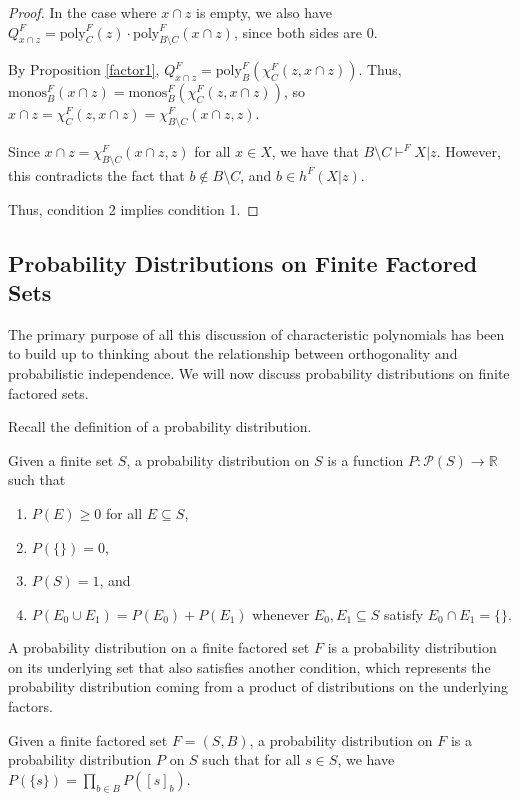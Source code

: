\documentclass[authordate,onecolumn]{miri-tech-article}
\begin{document}
\begin{proof}
In the case where $x\cap z$ is empty, we also have $Q^F_{x\cap z}= \text{poly}^F_{C}(z)\cdot \text{poly}^F_{B\setminus C}(x\cap z)$, since both sides are 0.

By Proposition \ref{factor1}, $Q^F_{x\cap z}=\text{poly}^F_{B}(\chi^F_{C}(z,x\cap z))$. Thus, $\text{monos}^F_B(x\cap z)=\text{monos}^F_B(\chi^F_{C}(z,x\cap z))$, so $x\cap z=\chi^F_{C}(z,x\cap z)=\chi^F_{B\setminus C}(x\cap z,z)$.

Since $x\cap z=\chi^F_{B\setminus C}(x\cap z,z)$ for all $x\in X$, we have that $B\setminus C\vdash^F X|z$. However, this contradicts the fact that $b\notin B\setminus C$, and $b\in h^F(X|z)$.

Thus, condition 2 implies condition 1.
\end{proof}
\subsection{Probability Distributions on Finite Factored Sets}
The primary purpose of all this discussion of characteristic polynomials has been to build up to thinking about the relationship between orthogonality and probabilistic independence. We will now discuss probability distributions on finite factored sets.

Recall the definition of a probability distribution.
\begin{definition}
Given a finite set $S$, a probability distribution on $S$ is a function $P:\mathcal{P}(S)\rightarrow\mathbb{R}$ such that \begin{enumerate}
    \item $P(E)\geq 0$ for all $E\subseteq S$,
    \item $P(\{\})=0$,
    \item $P(S)=1$, and
    \item $P(E_0\cup E_1)=P(E_0)+P(E_1)$ whenever $E_0,E_1\subseteq S$ satisfy $E_0\cap E_1=\{\}$.
\end{enumerate}
\end{definition}
A probability distribution on a finite factored set $F$ is a probability distribution on its underlying set that also satisfies another condition, which represents the probability distribution coming from a product of distributions on the underlying factors.
\begin{definition}
Given a finite factored set $F=(S,B)$, a probability distribution on $F$ is a probability distribution $P$ on $S$ such that for all $s\in S$, we have $P(\{s\})=\prod_{b\in B}P([s]_b)$.
\end{definition}
\end{document}

